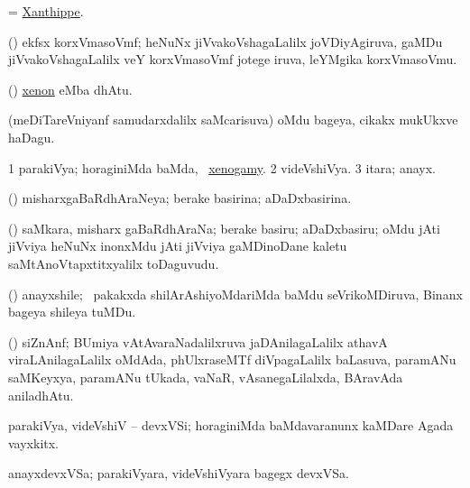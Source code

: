 \bentry
{} 
\gl{\nA}
\bmng
= \hyperlink{Xanthippe}{Xanthippe}.
\emng
\eentry


\bentry
{} 
\gl{\nA} 
\bmng
(\jiVvi) ekfsx korxVmasoVmf; heNuNx jiVvakoVshagaLalilx joVDiyAgiruva, gaMDu jiVvakoVshagaLalilx veY  korxVmasoVmf jotege iruva, leYMgika korxVmasoVmu.
\emng  
\eentry

\bentry
{} 
\gl{\saMkiSx}
\bmng
{}
\emng
\eentry

\bentry
{}
\gl{\saMkeV}
\bmng
(\ravi) \hyperlink{xenon}{xenon} eMba dhAtu.
\emng
\eentry

\bentry
{} 
\gl{\nA} 
\bmng
(meDiTareVniyanf samudarxdalilx saMcarisuva) oMdu bageya, cikakx mukUkxve haDagu. 
\emng
\eentry

\bentry
{} 
\gl{\sapUpa} 
\bmng
\bnum
\num{1} parakiVya; horaginiMda baMda, \udA\ \hyperlink{xenogamy}{xenogamy}.  
\num{2} videVshiVya. 
\num{3} itara; anayx.
\enum
\emng
\eentry

\bentry
{} 
\gl{\gu} 
\bmng
(\jiVvi) misharxgaBaRdhAraNeya; berake basirina; aDaDxbasirina.
\emng
\eentry

\bentry
{} 
\gl{\nA} 
\bmng
(\jiVvi) saMkara, misharx gaBaRdhAraNa; berake basiru; aDaDxbasiru; oMdu jAti jiVviya heNuNx inonxMdu jAti jiVviya gaMDinoDane kaletu saMtAnoVtapxtitxyalilx toDaguvudu.
\emng
\eentry

\bentry
{} 
\gl{\nA} 
\bmng
(\BUvi) anayxshile; \sA\ pakakxda shilArAshiyoMdariMda baMdu  seVrikoMDiruva, Binanx bageya shileya tuMDu.
\emng 
\eentry

\bentry
{} 
\gl{\nA}
\bmng
(\ravi) siZnAnf; BUmiya vAtAvaraNadalilxruva  jaDAnilagaLalilx athavA viraLAnilagaLalilx oMdAda, phUlxraseMTf  diVpagaLalilx baLasuva,  paramANu  saMKeyxya,  paramANu tUkada, vaNaR, vAsanegaLilalxda, BAravAda  aniladhAtu.
\emng  
\eentry

\bentry
{} 
\gl{\nA} 
\bmng
parakiVya, videVshiV -- devxVSi; horaginiMda  baMdavaranunx kaMDare Agada vayxkitx.
\emng  
\eentry

\bentry
{} 
\gl{\nA}
\bmng
anayxdevxVSa; parakiVyara, videVshiVyara bagegx devxVSa.
\emng
\eentry

